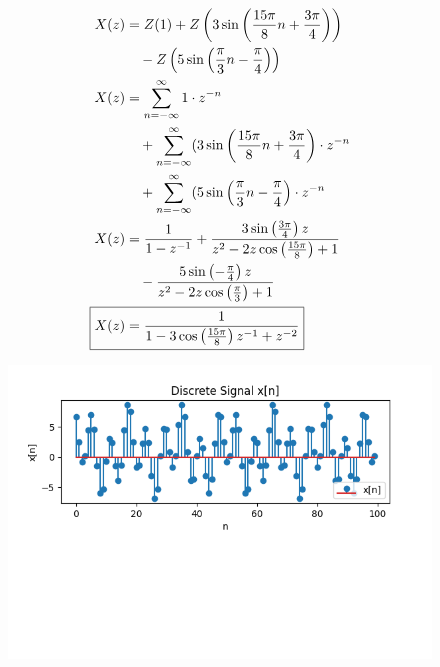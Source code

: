 \documentclass[journal,12pt,twocolumn]{IEEEtran}
\begin{document}
\begin{align}
X(z) &= Z(1) + Z\left(3\sin\left(\frac{15\pi}{8}n + \frac{3\pi}{4}\right)\right)\\
&\quad - Z\left(5\sin\left(\frac{\pi}{3}n - \frac{\pi}{4}\right)\right)\\
X(z) &= \sum_{n=-\infty}^{\infty} 1 \cdot z^{-n} \\
&\quad + \sum_{n=-\infty}^{\infty} (3\sin\left(\frac{15\pi}{8}n + \frac{3\pi}{4}\right) \cdot z^{-n} \\
&\quad + \sum_{n=-\infty}^{\infty} (5\sin\left(\frac{\pi}{3}n - \frac{\pi}{4}\right) \cdot z^{-n}\\
X(z) &= \frac{1}{1 - z^{-1}} + \frac{3\sin\left(\frac{3\pi}{4}\right)z}{z^2 - 2z\cos\left(\frac{15\pi}{8}\right) + 1} \\
&\quad - \frac{5\sin\left(-\frac{\pi}{4}\right)z}{z^2 - 2z\cos\left(\frac{\pi}{3}\right) + 1}\\
\Aboxed{X(z) &= \frac{1}{1 - 3\cos\left(\frac{15\pi}{8}\right)z^{-1} + z^{-2}} 
&\quad + \frac{5}{1 - 2\cos\left(\frac{\pi}{3}\right)z^{-1} + z^{-2}}} 
\end{align}
\begin{figure}[!ht] 
\centering
\includegraphics[width=2\columnwidth]{graph.png}
\label{fig:Graph1}
\end{figure}
\end{document}
